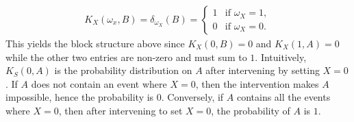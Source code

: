 \documentclass[../main.tex]{subfiles}
\begin{document}
\begin{ex}
        \begin{align*}
            K_X(\omega_x, B) = \delta_{\omega_X}(B) = \begin{cases}
                1 & \text{if } \omega_X = 1,\\
                0 & \text{if } \omega_X = 0.
            \end{cases}
        \end{align*}
        This yields the block structure above since ${K_X(0,B)=0}$ and ${K_X(1,A)=0}$ while the other two entries are non-zero and must sum to $1$. Intuitively, ${K_S(0,A)}$ is the probability distribution on ${A}$ after intervening by setting $X=0$. If ${A}$ does not contain an event where ${X=0}$, then the intervention makes ${A}$ impossible, hence the probability is $0$. Conversely, if $A$ contains all the events where $X=0$, then after intervening to set $X=0$, the probability of $A$ is $1$.
    \end{ex}
\end{document}
